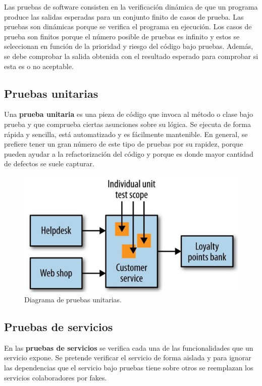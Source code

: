 \documentclass[11pt,spanish,listoffigures]{tfgetsinf}
\begin{document}
Las pruebas de software consisten en la verificación dinámica de que un programa produce las salidas esperadas para un conjunto finito de casos de prueba. Las pruebas son dinámicas porque se verifica el programa en ejecución. Los casos de prueba son finitos porque el número posible de pruebas es infinito y estos se seleccionan en función de la prioridad y riesgo del código bajo pruebas. Además, se debe comprobar la salida obtenida con el resultado esperado para comprobar si esta es o no aceptable. \cite{Bourque2014}

\subsection{Pruebas unitarias}

Una \textbf{prueba unitaria} es una pieza de código que invoca al método o clase bajo prueba y que comprueba ciertas asunciones sobre su lógica. Se ejecuta de forma rápida y sencilla, está automatizado y es fácilmente mantenible. \cite{Osherove2014} En general, se prefiere tener un gran número de este tipo de pruebas por su rapidez, porque pueden ayudar a la refactorización del código y porque es donde mayor cantidad de defectos se suele capturar.

\begin{figure}[h]
\centering
\includegraphics[scale=0.5]{Unit_Tests}
\caption{Diagrama de pruebas unitarias.}
\end{figure}

\subsection{Pruebas de servicios}

En las \textbf{pruebas de servicios} se verifica cada una de las funcionalidades que un servicio expone. Se pretende verificar el servicio de forma aislada y para ignorar las dependencias que el servicio bajo pruebas tiene sobre otros se reemplazan los servicios colaboradores por fakes.
\end{document}
